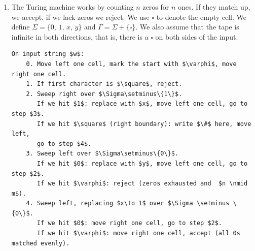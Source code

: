 \documentclass[12pt]{article}
\begin{document}
\begin{solution}
\begin{enumerate}
    \item The Turing machine works by counting $n$ zeros for $n$ ones. If they match up, we accept, if we lack zeros we reject. We use $\square$ to denote the empty cell. We define $\Sigma =\{0, \, 1, \, x, \, y \}$ and $\Gamma = \Sigma + \{\square\}$. We also assume that the tape is infinite in both directions, that is, there is a $\square$ on both sides of the input. 
    \begin{center}
        \end{center}

         \begin{lstlisting}[mathescape]
On input string $w$:
    0. Move left one cell, mark the start with $\varphi$, move right one cell.
    1. If first character is $\square$, reject.
    2. Sweep right over $\Sigma\setminus\{1\}$.
       If we hit $1$: replace with $x$, move left one cell, go to step $3$.
       If we hit $\square$ (right boundary): write $\#$ here, move left, 
       go to step $4$.
    3. Sweep left over $\Sigma\setminus\{0\}$.
       If we hit $0$: replace with $y$, move left one cell, go to step $2$.
       If we hit $\varphi$: reject (zeros exhausted and  $n \nmid m$).
    4. Sweep left, replacing $x\to 1$ over $\Sigma \setminus \{0\}$.
       If we hit $0$: move right one cell, go to step $2$.
       If we hit $\varphi$: move right one cell, accept (all 0s matched evenly).
        \end{lstlisting}
    
    \end{enumerate}
\end{solution}
\end{document}
